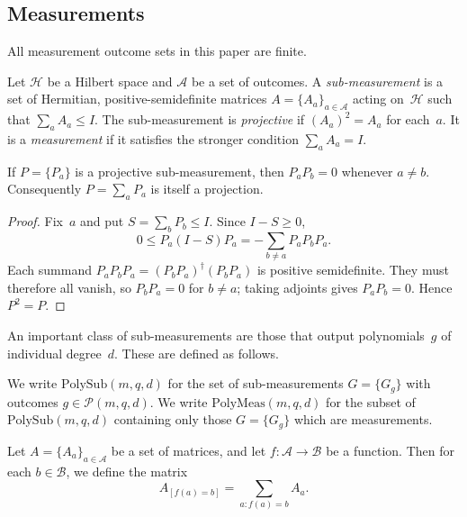 \documentclass[11pt]{article}
\theoremstyle{definition}
\newcommand{\calA}{\mathcal{A}}
\newcommand{\calB}{\mathcal{B}}
\newcommand{\calH}{\mathcal{H}}
\newcommand{\calP}{\mathcal{P}}
\newcommand{\polyfunc}[3]{\calP(#1, #2, #3)}
\newcommand{\polymeas}[3]{\mathrm{PolyMeas}(#1, #2, #3)}
\newcommand{\polysub}[3]{\mathrm{PolySub}(#1, #2, #3)}
\begin{document}
\subsection{Measurements}

All measurement outcome sets in this paper are finite.

\begin{definition}
Let $\calH$ be a Hilbert space and $\calA$ be a set of outcomes.
A \emph{sub-measurement}
is a set of Hermitian, positive-semidefinite matrices
$A = \{A_a\}_{a \in \calA}$
acting on~$\calH$
such that $\sum_a A_a \leq I$.
The sub-measurement is \emph{projective} if $(A_a)^2 = A_a$ for each~$a$.
It is a \emph{measurement}
if it satisfies the stronger condition $\sum_a A_a = I$.
\end{definition}

\begin{proposition}
\label{prop:projective-submeasurement-orthogonal}
If $P=\{P_a\}$ is a projective sub-measurement, then
$P_aP_b=0$ whenever $a\ne b$.  Consequently
$P=\sum_aP_a$ is itself a projection.
\end{proposition}
\begin{proof}
Fix~$a$ and put $S=\sum_bP_b\leq I$.  Since $I-S\geq0$,
\[
0\leq P_a(I-S)P_a=-\sum_{b\ne a}P_aP_bP_a.
\]
Each summand $P_aP_bP_a=(P_bP_a)^\dagger(P_bP_a)$ is positive
semidefinite.  They must therefore all vanish, so $P_bP_a=0$ for
$b\ne a$; taking adjoints gives $P_aP_b=0$.  Hence $P^2=P$.
\end{proof}

An important class of sub-measurements
are those that output polynomials~$g$ of individual degree~$d$.
These are defined as follows.

\begin{definition}
We write $\polysub{m}{q}{d}$ for the set of sub-measurements $G=\{G_g\}$
with outcomes $g \in \polyfunc{m}{q}{d}$.
We write $\polymeas{m}{q}{d}$ for the subset of $\polysub{m}{q}{d}$
containing only those $G = \{G_g\}$ which are measurements.
\end{definition}

\begin{definition}\label{def:post-processing}
Let $A = \{A_a\}_{a \in \calA}$ be a set of matrices,
and let $f:\calA \rightarrow \calB$ be a function.
Then for each $b \in \calB$,
we define the matrix
\begin{equation*}
A_{[f(a)=b]} = \sum_{a:f(a)=b} A_a.
\end{equation*}
\end{definition}
\end{document}
